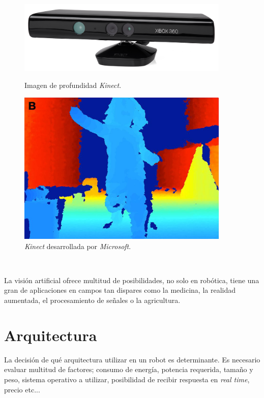 \begin{figure} [h!]
	\begin{center}
		\begin{minipage}{0.45\textwidth}
			\begin{center}
				\includegraphics[width=0.9\textwidth]{figs/kinect}
			\end{center}
			\caption{Imagen de profundidad \textit{Kinect}.}
		\end{minipage}\hfill
		\begin{minipage}{0.35\textwidth}
			\begin{center}
				\includegraphics[width=0.9\textwidth]{figs/depth}
			\end{center}
			\caption{\textit{Kinect} desarrollada por \textit{Microsoft}.}
		\end{minipage}
	\end{center}
\end{figure}\


La visión artificial ofrece multitud de posibilidades, no solo en robótica, tiene una gran de aplicaciones en campos tan dispares como la medicina, la realidad aumentada, el procesamiento de señales o la agricultura.\\

\section{Arquitectura}
\label{sec:arquitectura}
La decisión de qué arquitectura utilizar en un robot es determinante. Es necesario evaluar multitud de factores; consumo de energía, potencia requerida, tamaño y peso, sistema operativo a utilizar, posibilidad de recibir respuesta en \textit{real time}, precio etc...\\

